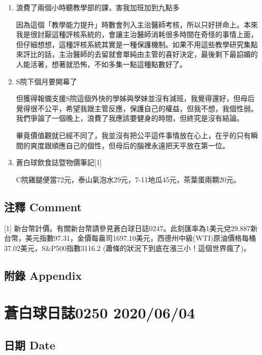 \documentclass[
]{article}
\begin{document}
\begin{enumerate}
\def\labelenumi{\arabic{enumi}.}
\item
  浪費了兩個小時聽教學部的課，害我加班加到九點多

  因為這個「教學能力提升」時數會列入主治醫師考核，所以只好拼命上。本來我是很討厭這種評核系統的，會讓主治醫師消耗很多時間在奇怪的事情上面，但仔細想想，這種評核系統其實是一種保護機制。如果不用這些教學研究集點來評比的話，主治醫師的去留就會單純由主管的喜好決定，最後剩下最諂媚的人能活著，想著就恐怖，不如多集一點這種點數好了。
\item
  S院下個月要開幕了

  但獲得報備支援S院這個外快的學姊與學妹並沒有減班，我覺得還好，但母后覺得很不公平，希望我跟主管反應，保護自己的權益，但我不想，我個性弱。我們爭論了一個晚上，浪費了我應該要健身的時間，但終究是沒有結論。

  畢竟價值觀就已經不同了，我並沒有把公平這件事情放在心上，在乎的只有瞬間的爽度跟順應自己的個性，但母后的腦裡永遠把天平放在第一位。
\item
  蒼白球飲食誌暨物價筆記{[}1{]}

  C院雞腿便當72元，泰山氣泡水29元，7-11地瓜45元，茶葉蛋兩顆20元。
\end{enumerate}

\hypertarget{ux6ce8ux91cb-comment-2}{%
\subsection{注釋 Comment}\label{ux6ce8ux91cb-comment-2}}

{[}1{]}
新台幣計價。有關新台幣請參見蒼白球日誌0247。此刻匯率為1美元兌29.887新台幣，美元指數97.31，金價每盎司1697.10美元，西德州中級(WTI)原油價格每桶37.02美元，S\&P500指數3116.2
(蕭條的狀況下到底在漲三小！這個世界瘋了)。

\hypertarget{ux9644ux9304-appendix-2}{%
\subsection{附錄 Appendix}\label{ux9644ux9304-appendix-2}}

\hypertarget{ux84bcux767dux7403ux65e5ux8a8c0250-20200604}{%
\section{蒼白球日誌0250
2020/06/04}\label{ux84bcux767dux7403ux65e5ux8a8c0250-20200604}}

\hypertarget{ux65e5ux671f-date-3}{%
\subsection{日期 Date}\label{ux65e5ux671f-date-3}}
\end{document}
